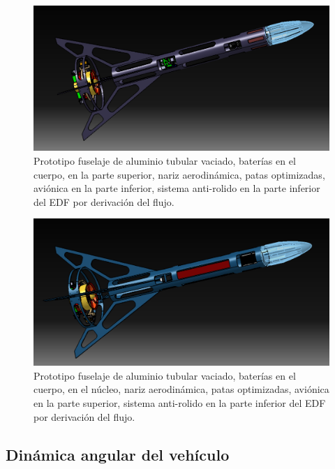\begin{figure}[htb]
    \centering
    \includegraphics[width=\linewidth]{fig/design/4}
    \caption{Prototipo fuselaje de aluminio tubular vaciado, baterías en el cuerpo, en la parte superior, nariz
    aerodinámica, patas optimizadas, aviónica en la parte inferior, sistema anti-rolido en la parte
    inferior del EDF por derivación del flujo.}
    \label{fig:design/4}
\end{figure}


\begin{figure}[htb]
    \centering
    \includegraphics[width=\linewidth]{fig/design/5}
    \caption{Prototipo fuselaje de aluminio tubular vaciado, baterías en el cuerpo, en el núcleo, nariz aerodinámica, patas optimizadas, aviónica en la parte superior, sistema anti-rolido en la parte
    inferior del EDF por derivación del flujo.}
    \label{fig:design/5}
\end{figure}

\null\newpage
\clearpage

\subsection{Dinámica angular del vehículo} \label{ssec:ecuacionangular}


